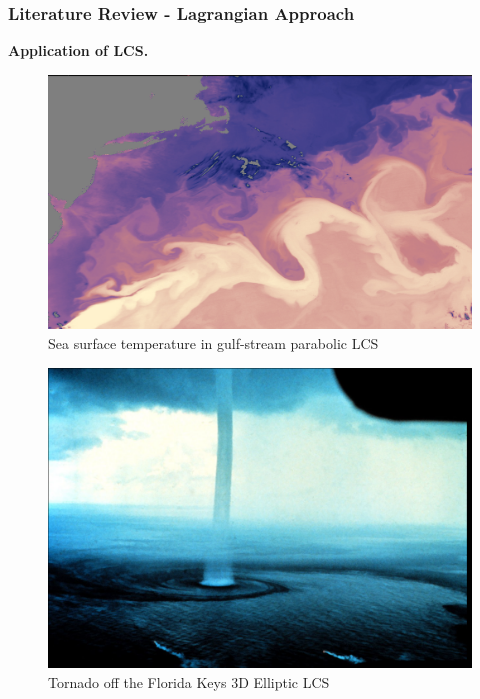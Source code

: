 \documentclass[../presentation.tex]{subfiles}
\begin{document}

\begin{frame}
  \frametitle{Literature Review - Lagrangian Approach}

  \textbf{Application of LCS.} \\
  \begin{minipage}{0.45\linewidth}
    \begin{figure}[H]
      \centering
      \includegraphics[width=\linewidth]{images/figure2.png}
      \caption{Sea surface temperature in gulf-stream parabolic LCS}
    \end{figure}  
  \end{minipage} \hfill
  \begin{minipage}{0.45\linewidth}
    \begin{figure}[H]
      \centering
      \includegraphics[width=\linewidth]{images/figure3.png}
      \caption{Tornado off the Florida Keys 3D Elliptic LCS}
    \end{figure}
  \end{minipage}
\end{frame}
\end{document}
